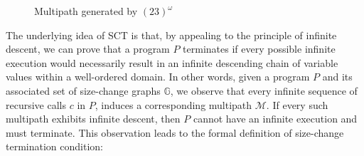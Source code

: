 \documentclass{article}
\begin{document}
\begin{example}
\begin{figure}[h]
\caption{Multipath generated by $(23)^{\omega}$}
\label{multipath}
\end{figure}

\end{example}

The underlying idea of SCT is that, by appealing to the principle of infinite descent, we can prove that a program $P$ terminates if every possible infinite execution would necessarily result in an infinite descending chain of variable values within a well-ordered domain. In other words, given a program $P$ and its associated set of size-change graphs $\mathbb{G}$, we observe that every infinite sequence of recursive calls $c$ in $P$, induces a corresponding multipath $\mathcal{M}$. If every such multipath exhibits infinite descent, then $P$ cannot have an infinite execution and must terminate. This observation leads to the formal definition of size-change termination condition:
\end{document}
